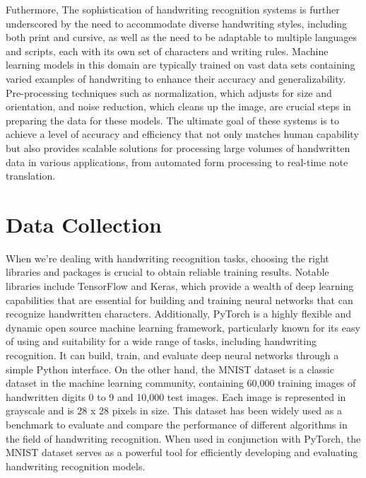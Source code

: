 \documentclass[12pt]{article}
\begin{document}
Futhermore, The sophistication of handwriting recognition systems is further underscored by the need to accommodate diverse handwriting styles, including both print and cursive, as well as the need to be adaptable to multiple languages and scripts, each with its own set of characters and writing rules. Machine learning models in this domain are typically trained on vast data sets containing varied examples of handwriting to enhance their accuracy and generalizability. Pre-processing techniques such as normalization, which adjusts for size and orientation, and noise reduction, which cleans up the image, are crucial steps in preparing the data for these models. The ultimate goal of these systems is to achieve a level of accuracy and efficiency that not only matches human capability but also provides scalable solutions for processing large volumes of handwritten data in various applications, from automated form processing to real-time note translation.

\section* {Data Collection}
When we're dealing with handwriting recognition tasks, choosing the right libraries and packages is crucial to obtain reliable training results. Notable libraries include TensorFlow and Keras, which provide a wealth of deep learning capabilities that are essential for building and training neural networks that can recognize handwritten characters. Additionally, PyTorch is a highly flexible and dynamic open source machine learning framework, particularly known for its easy of using and suitability for a wide range of tasks, including handwriting recognition. It can build, train, and evaluate deep neural networks through a simple Python interface. On the other hand, the MNIST dataset is a classic dataset in the machine learning community, containing 60,000 training images of handwritten digits 0 to 9 and 10,000 test images. Each image is represented in grayscale and is 28 x 28 pixels in size. This dataset has been widely used as a benchmark to evaluate and compare the performance of different algorithms in the field of handwriting recognition. When used in conjunction with PyTorch, the MNIST dataset serves as a powerful tool for efficiently developing and evaluating handwriting recognition models.
\end{document}
